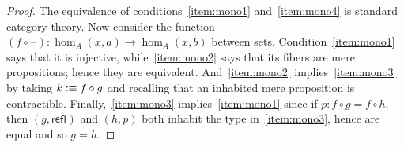 \documentclass[10pt,a4paper]{article}
\newcommand{\defeq}{\vcentcolon\equiv}  %
\newcommand{\refl}[1]{\ensuremath{\mathsf{refl}_{#1}}\xspace}
\newcommand{\blank}{\mathord{\hspace{1pt}\text{--}\hspace{1pt}}}
\theoremstyle{definition}
\theoremstyle{remark}
\numberwithin{equation}{section}
\begin{document}
\begin{proof}
  The equivalence of conditions~\ref{item:mono1} and~\ref{item:mono4} is standard category theory.
  Now consider the function $(f\circ \blank ):\hom_A(x,a) \to \hom_A(x,b)$ between sets.
  Condition~\ref{item:mono1} says that it is injective, while~\ref{item:mono2} says that its fibers are mere propositions; hence they are equivalent.
  And~\ref{item:mono2} implies~\ref{item:mono3} by taking $k\defeq f\circ g$ and recalling that an inhabited mere proposition is contractible.
  Finally,~\ref{item:mono3} implies~\ref{item:mono1} since if $p:f\circ g= f\circ h$, then $(g,\refl{})$ and $(h,p)$ both inhabit the type in~\ref{item:mono3}, hence are equal and so $g=h$.
\end{proof}
\end{document}
